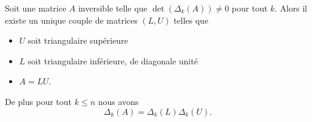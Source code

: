 \begin{theorem}       \label{THOooUXKJooYaPhiu}
	Soit une matrice \( A\) inversible telle que \( \det(\Delta_k(A))\neq 0\) pour tout \( k\). Alors il existe un unique couple de matrices \( (L,U)\) telles que
	\begin{itemize}
		\item \( U\) soit triangulaire supérieure
		\item \( L\) soit triangulaire inférieure, de diagonale unité
		\item \( A=LU\).
	\end{itemize}
	De plus pour tout \( k\leq n\) nous avons
	\begin{equation}
		\Delta_k(A)=\Delta_k(L)\Delta_k(U).
	\end{equation}
\end{theorem}

